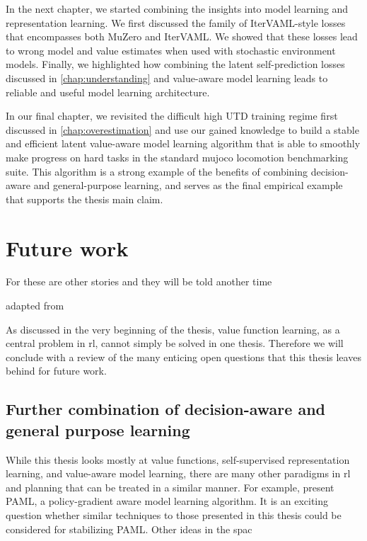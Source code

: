 In the next chapter, we started combining the insights into model learning and representation learning.
We first discussed the family of IterVAML-style losses that encompasses both MuZero and IterVAML.
We showed that these losses lead to wrong model and value estimates when used with stochastic environment models.
Finally, we highlighted how combining the latent self-prediction losses discussed in \autoref{chap:understanding} and value-aware model learning leads to reliable and useful model learning architecture.

In our final chapter, we revisited the difficult high UTD training regime first discussed in \autoref{chap:overestimation} and use our gained knowledge to build a stable and efficient latent value-aware model learning algorithm that is able to smoothly make progress on hard tasks in the standard mujoco locomotion benchmarking suite.
This algorithm is a strong example of the benefits of combining decision-aware and general-purpose learning, and serves as the final empirical example that supports the thesis main claim.


\section{Future work}

\epigraph{For these are other stories and they will be told another time}{adapted from \cite{ende1993neverending}}

As discussed in the very beginning of the thesis, value function learning, as a central problem in \ac{rl}, cannot simply be solved in one thesis.
Therefore we will conclude with a review of the many enticing open questions that this thesis leaves behind for future work.

\subsection{Further combination of decision-aware and general purpose learning}

While this thesis looks mostly at value functions, self-supervised representation learning, and value-aware model learning, there are many other paradigms in \ac{rl} and planning that can be treated in a similar manner.
For example, \textcite{abachi2020policy} present PAML, a policy-gradient aware model learning algorithm.
It is an exciting question whether similar techniques to those presented in this thesis could be considered for stabilizing PAML.
Other ideas in the spac

